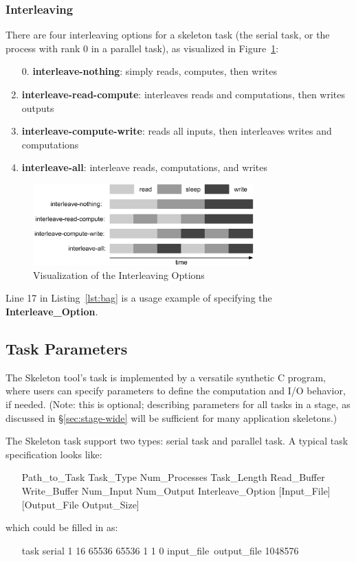 \documentclass[10pt,a4paper]{article}
\begin{document}
\subsubsection{Interleaving}\label{sec:inter}

There are four interleaving options for a skeleton task (the serial task, or the process with rank 0 in a parallel task), as visualized in Figure~\ref{fig:interleave}:
\begin{enumerate}
\item[0.] \textbf{interleave-nothing}: simply reads, computes, then writes
\item{\textbf{interleave-read-compute}:} interleaves reads and computations, then writes outputs
\item{\textbf{interleave-compute-write}:} reads all inputs, then interleaves writes and computations
\item{\textbf{interleave-all}:} interleave reads, computations, and writes
\end{enumerate}

\begin{figure}[h]
\begin{center}
    \includegraphics[width=85mm]{picture/Interleave}
\caption {Visualization of the Interleaving Options
    \label{fig:interleave}
}
\end{center}
\end{figure}

Line 17 in Listing~\ref{lst:bag} is a usage example of specifying the \textbf{Interleave\_Option}.

\subsection{Task Parameters}

The Skeleton tool's task is implemented by a versatile synthetic C program, where users can specify parameters to define
the computation and I/O behavior, if needed. (Note: this is optional; describing parameters for all tasks in a stage, as discussed in \S\ref{sec:stage-wide} 
will be sufficient for many application skeletons.)

The Skeleton task support two types: serial task and parallel task. 
A typical task specification looks like:
\begin{itemize}
\item[] Path\_to\_Task Task\_Type Num\_Processes Task\_Length Read\_Buffer Write\_Buffer Num\_Input Num\_Output Interleave\_Option [Input\_File] [Output\_File Output\_Size]
\end{itemize}
which could be filled in as:
\begin{itemize}
\item [] task serial 1 16 65536 65536 1 1 0 input\_file\ output\_file 1048576
\end{itemize}
\end{document}
